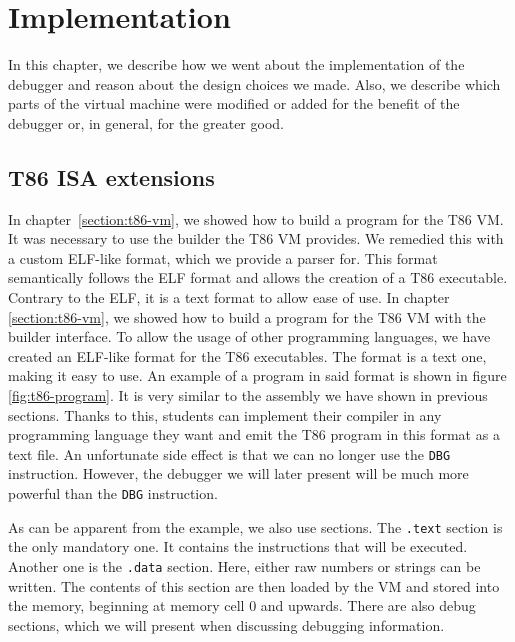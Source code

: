 \chapter{Implementation}
In this chapter, we describe how we went about the implementation of the
debugger and reason about the design choices we made. Also, we describe which
parts of the virtual machine were modified or added for the benefit of the
debugger or, in general, for the greater good.

\section{T86 ISA extensions}\label{section:parser}
In chapter~\ref{section:t86-vm}, we showed how to build a program for the T86
VM. It was necessary to use the builder the T86 VM provides. We remedied this
with a custom ELF-like format, which we provide a parser for. This format
semantically follows the ELF format and allows the creation of a T86
executable. Contrary to the ELF, it is a text format to allow ease of use. In
chapter \ref{section:t86-vm}, we showed how to build a program for the T86 VM
with the builder interface. To allow the usage of other programming languages,
we have created an ELF-like format for the T86 executables. The format is a
text one, making it easy to use. An example of a program in said format is
shown in figure \ref{fig:t86-program}. It is very similar to the assembly we
have shown in previous sections. Thanks to this, students can implement their
compiler in any programming language they want and emit the T86 program in this
format as a text file. An unfortunate side effect is that we can no longer use
the \texttt{DBG} instruction. However, the debugger we will later present will
be much more powerful than the \texttt{DBG} instruction.

As can be apparent from the example, we also use sections. The \texttt{.text}
section is the only mandatory one. It contains the instructions that will be
executed. Another one is the \texttt{.data} section. Here, either raw numbers
or strings can be written. The contents of this section are then loaded by the
VM and stored into the memory, beginning at memory cell 0 and upwards. There
are also debug sections, which we will present when discussing debugging
information.

